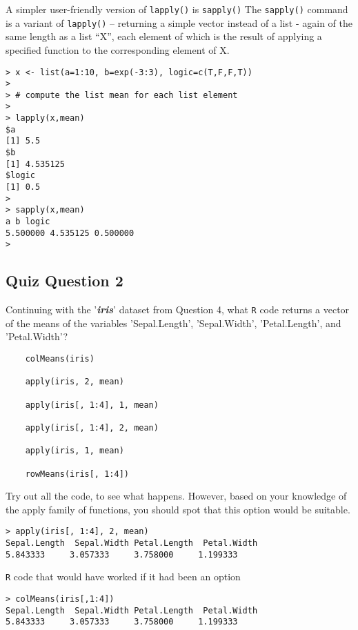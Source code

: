 \documentclass[12pt]{article}
\begin{document}
A simpler user-friendly version of \texttt{lapply()} is \texttt{sapply()}
The \texttt{sapply()} command is a variant of \texttt{lapply()} – returning a simple vector instead of a list - again of the same length as a list “X”, each element of which is the result of applying a specified function to the corresponding element of X.

\begin{verbatim}
> x <- list(a=1:10, b=exp(-3:3), logic=c(T,F,F,T))
>
> # compute the list mean for each list element
>
> lapply(x,mean)
$a
[1] 5.5
$b
[1] 4.535125
$logic
[1] 0.5
>
> sapply(x,mean)
a b logic
5.500000 4.535125 0.500000
>
\end{verbatim}

\newpage
\subsection*{Quiz Question 2} %
Continuing with the '\textit{\textbf{iris}}' dataset from Question 4, what \texttt{R} code returns a vector of the means of the variables 'Sepal.Length', 'Sepal.Width', 'Petal.Length', and 'Petal.Width'?
\begin{framed}
	\begin{verbatim}
	colMeans(iris)
	
	apply(iris, 2, mean)
	
	apply(iris[, 1:4], 1, mean)
	
	apply(iris[, 1:4], 2, mean)
	
	apply(iris, 1, mean)
	
	rowMeans(iris[, 1:4])
	\end{verbatim}
\end{framed}
Try out all the code, to see what happens. However, based on your knowledge of the apply family of functions, you should spot that this option would be suitable.
\begin{verbatim}
> apply(iris[, 1:4], 2, mean)
Sepal.Length  Sepal.Width Petal.Length  Petal.Width 
5.843333     3.057333     3.758000     1.199333 
\end{verbatim}

\noindent \texttt{R} code that would have worked if it had been an option

\begin{verbatim}
> colMeans(iris[,1:4])
Sepal.Length  Sepal.Width Petal.Length  Petal.Width 
5.843333     3.057333     3.758000     1.199333
\end{verbatim}
\end{document}
